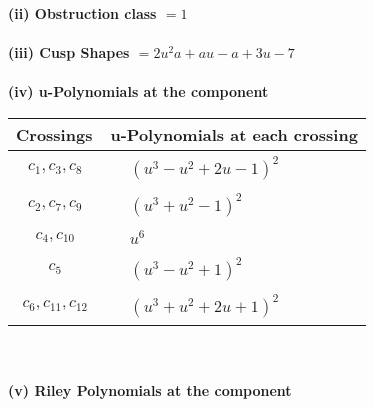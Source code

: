 \documentclass[1p]{elsarticle_modified}
\theoremstyle{definition}
\begin{document}
\flushleft \textbf{(ii) Obstruction class $= 1$}\\~\\
\flushleft \textbf{(iii) Cusp Shapes $= 2 u^2 a+a u- a+3 u-7$}\\~\\
\newpage\renewcommand{\arraystretch}{1}
\flushleft \textbf{(iv) u-Polynomials at the component}\newline \\
\begin{tabular}{m{50pt}|m{274pt}}
Crossings & \hspace{64pt}u-Polynomials at each crossing \\
\hline $$\begin{aligned}c_{1},c_{3},c_{8}\end{aligned}$$&$\begin{aligned}
&(u^3- u^2+2 u-1)^2
\end{aligned}$\\
\hline $$\begin{aligned}c_{2},c_{7},c_{9}\end{aligned}$$&$\begin{aligned}
&(u^3+u^2-1)^2
\end{aligned}$\\
\hline $$\begin{aligned}c_{4},c_{10}\end{aligned}$$&$\begin{aligned}
&u^6
\end{aligned}$\\
\hline $$\begin{aligned}c_{5}\end{aligned}$$&$\begin{aligned}
&(u^3- u^2+1)^2
\end{aligned}$\\
\hline $$\begin{aligned}c_{6},c_{11},c_{12}\end{aligned}$$&$\begin{aligned}
&(u^3+u^2+2 u+1)^2
\end{aligned}$\\
\hline
\end{tabular}\\~\\
\newpage\renewcommand{\arraystretch}{1}
\flushleft \textbf{(v) Riley Polynomials at the component}\newline \\
\end{document}
